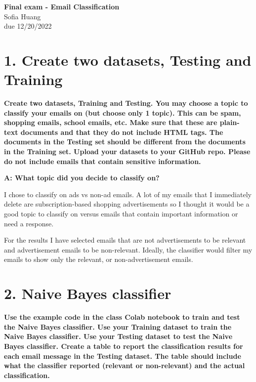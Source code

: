 \documentclass[12pt]{article}
\begin{document}
\begin{centering}
{\large\textbf{Final exam - Email Classification}}\\ 
Sofia Huang\\
due 12/20/2022\\
\end{centering}


\section*{1. Create two datasets, Testing and Training}
\noindent \textbf{Create two datasets, Training and Testing. You may choose a topic to classify your emails on (but choose only 1 topic). This can be spam, shopping emails, school emails, etc. Make sure that these are plain-text documents and that they do not include HTML tags. The documents in the Testing set should be different from the documents in the Training set. Upload your datasets to your GitHub repo. Please do not include emails that contain sensitive information.}

\noindent\textbf{A: What topic did you decide to classify on?}

I chose to classify on ads vs non-ad emails. A lot of my emails that I immediately delete are subscription-based shopping advertisements so I thought it would be a good topic to classify on versus emails that contain important information or need a response. 

For the results I have selected emails that are not advertisements to be relevant and advertisement emails to be non-relevant. Ideally, the classifier would filter my emails to show only the relevant, or non-advertisement emails.

\section*{2. Naive Bayes classifier}
\noindent \textbf{Use the example code in the class Colab notebook to train and test the Naive Bayes classifier.
Use your Training dataset to train the Naive Bayes classifier.
Use your Testing dataset to test the Naive Bayes classifier.
Create a table to report the classification results for each email message in the Testing dataset. The table should include what the classifier reported (relevant or non-relevant) and the actual classification.}
\end{document}
